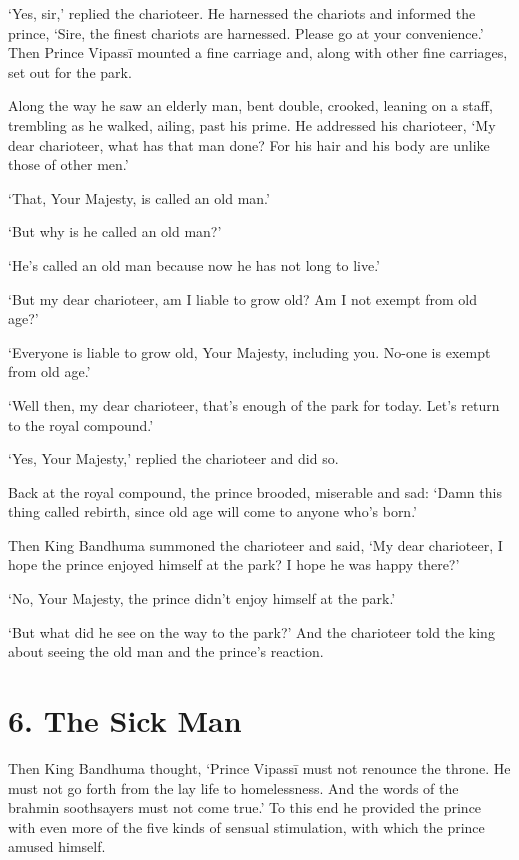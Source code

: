 \documentclass[12pt,openany]{book}%
\begin{document}
‘Yes, sir,’ replied the charioteer. He harnessed the chariots and informed the prince, ‘Sire, the finest chariots are harnessed. Please go at your convenience.’ Then Prince \textsanskrit{Vipassī} mounted a fine carriage and, along with other fine carriages, set out for the park. 

Along the way he saw an elderly man, bent double, crooked, leaning on a staff, trembling as he walked, ailing, past his prime. He addressed his charioteer, ‘My dear charioteer, what has that man done? For his hair and his body are unlike those of other men.’ 

‘That, Your Majesty, is called an old man.’ 

‘But why is he called an old man?’ 

‘He’s called an old man because now he has not long to live.’ 

‘But my dear charioteer, am I liable to grow old? Am I not exempt from old age?’ 

‘Everyone is liable to grow old, Your Majesty, including you. No-one is exempt from old age.’ 

‘Well then, my dear charioteer, that’s enough of the park for today. Let’s return to the royal compound.’ 

‘Yes, Your Majesty,’ replied the charioteer and did so. 

Back at the royal compound, the prince brooded, miserable and sad: ‘Damn this thing called rebirth, since old age will come to anyone who’s born.’ 

Then King Bandhuma summoned the charioteer and said, ‘My dear charioteer, I hope the prince enjoyed himself at the park? I hope he was happy there?’ 

‘No, Your Majesty, the prince didn’t enjoy himself at the park.’ 

‘But what did he see on the way to the park?’ And the charioteer told the king about seeing the old man and the prince’s reaction. 

\section*{6. The Sick Man }

Then King Bandhuma thought, ‘Prince \textsanskrit{Vipassī} must not renounce the throne. He must not go forth from the lay life to homelessness. And the words of the brahmin soothsayers must not come true.’ To this end he provided the prince with even more of the five kinds of sensual stimulation, with which the prince amused himself. 
\end{document}

